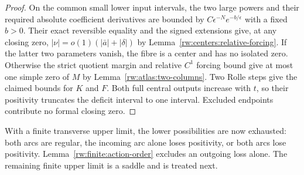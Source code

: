 \begin{proof}
On the common small lower input intervals, the two large powers
and their required absolute coefficient derivatives are bounded
by $C\epsilon^{-N}e^{-b/\epsilon}$ with a fixed $b>0$.
Their exact reversible equality and the signed extensions give,
at any closing zero, $|\nu|=o(1)(|\bar a|+|\delta|)$ by
Lemma~\ref{rw:centers:relative-forcing}. If the latter two
parameters vanish, the fibre is a center and has no isolated zero.
Otherwise the strict quotient margin and relative $C^1$ forcing bound
give at most one simple zero of $M$ by
Lemma~\ref{rw:atlas:two-columns}.
Two Rolle steps give the claimed bounds for $K$ and $F$.
Both full central outputs increase with $t$, so their positivity
truncates the deficit interval to one interval. Excluded endpoints
contribute no formal closing zero.
\end{proof}

With a finite transverse upper limit, the lower possibilities are now
exhausted: both arcs are regular, the incoming arc alone loses
positivity, or both arcs lose positivity.
Lemma~\ref{rw:finite:action-order} excludes an outgoing loss alone.
The remaining finite upper limit is a saddle and is treated next.
